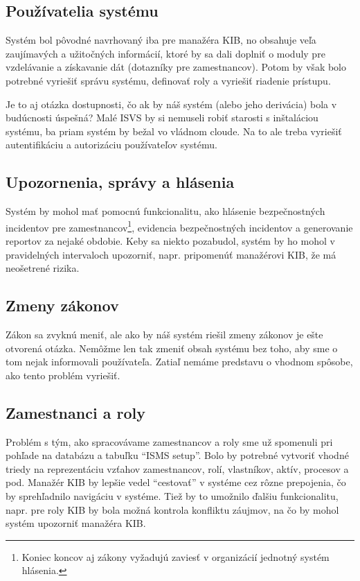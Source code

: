 \subsection*{Používatelia systému}
Systém bol pôvodné navrhovaný iba pre manažéra KIB, no obsahuje veľa zaujímavých a užitočných informácií, ktoré by sa dali
doplniť o moduly pre vzdelávanie a získavanie dát (dotazníky pre zamestnancov). Potom by však bolo potrebné vyriešiť
správu systému, definovať roly a vyriešiť riadenie prístupu.

Je to aj otázka dostupnosti, čo ak by náš systém (alebo jeho derivácia) bola v budúcnosti úspešná? Malé ISVS by si nemuseli
robiť starosti s inštaláciou systému, ba priam systém by bežal vo vládnom cloude. Na to ale treba vyriešiť autentifikáciu
a autorizáciu používateľov systému.

\subsection*{Upozornenia, správy a hlásenia}
Systém by mohol mať pomocnú funkcionalitu, ako hlásenie bezpečnostných incidentov pre zamestnancov\footnote{Koniec koncov
aj zákony vyžadujú zaviesť v organizácií jednotný systém hlásenia.}, evidencia bezpečnostných incidentov a generovanie
reportov za nejaké obdobie. Keby sa niekto pozabudol, systém by ho mohol v pravidelných intervaloch upozorniť, napr.
pripomenúť manažérovi KIB, že má neošetrené rizika.

\subsection*{Zmeny zákonov}
Zákon sa zvyknú meniť, ale ako by náš systém riešil zmeny zákonov je ešte otvorená otázka. Nemôžme len tak zmeniť obsah
systému bez toho, aby sme o tom nejak informovali používateľa. Zatiaľ nemáme predstavu o vhodnom spôsobe, ako tento problém
vyriešiť.

\subsection*{Zamestnanci a roly}
Problém s tým, ako spracovávame zamestnancov a roly sme už spomenuli pri pohľade na databázu a tabuľku \enquote{ISMS setup}.
Bolo by potrebné vytvoriť vhodné triedy na reprezentáciu vzťahov zamestnancov, rolí, vlastníkov, aktív, procesov a pod.
Manažér KIB by lepšie vedel \enquote{cestovať} v systéme cez rôzne prepojenia, čo by sprehľadnilo navigáciu v systéme.
Tiež by to umožnilo ďalšiu funkcionalitu, napr. pre roly KIB by bola možná kontrola konfliktu záujmov, na čo by mohol
systém upozorniť manažéra KIB.

